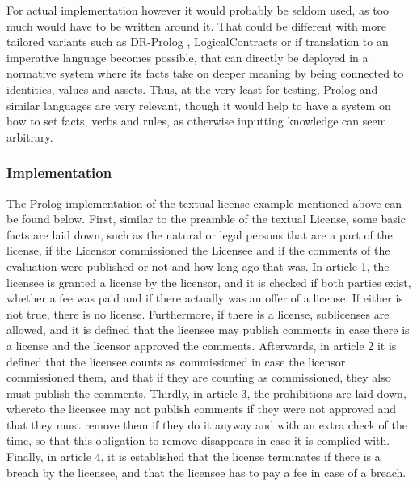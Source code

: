 \documentclass[conference]{IEEEtran}
\begin{document}
For actual implementation however it would probably be seldom used, as too much would have to be written around it. That could be different with more tailored variants such as DR-Prolog \cite{antoniouDRPrologSystemDefeasible2007}, LogicalContracts \cite{LogicalContractsAlpha} or if translation to an imperative language becomes possible, that can directly be deployed in a normative system where its facts take on deeper meaning by being connected to identities, values and assets. %
Thus, at the very least for testing, Prolog and similar languages are very relevant, though it would help to have a system on how to set facts, verbs and rules, as otherwise inputting knowledge can seem arbitrary. 

\subsubsection{Implementation}
The Prolog implementation of the textual license example mentioned above can be found below. %
First, similar to the preamble of the textual License, some basic facts are laid down, such as the natural or legal persons that are a part of the license, if the Licensor commissioned the Licensee and if the comments of the evaluation were published or not and how long ago that was. %
In article 1, the licensee is granted a license by the licensor, and it is checked if both parties exist, whether a fee was paid and if there actually was an offer of a license. If either is not true, there is no license. Furthermore, if there is a license, sublicenses are allowed, and it is defined that the licensee may publish comments in case there is a license and the licensor approved the comments.
Afterwards, in article 2 it is defined that the licensee counts as commissioned in case the licensor commissioned them, and that if they are counting as commissioned, they also must publish the comments.
Thirdly, in article 3,  the prohibitions are laid down, whereto the licensee may not publish comments if they were not approved and that they must remove them if they do it anyway and with an extra check of the time, so that this obligation to remove disappears in case it is complied with.
Finally, in article 4, it is established that the license terminates if there is a breach by the licensee, and that the licensee has to pay a fee in case of a breach.
\end{document}
